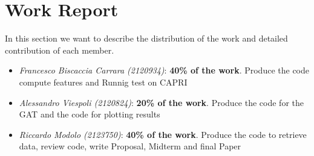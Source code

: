\documentclass[12pt,conference]{ieeeconf} %
\begin{document}
\section*{Work Report}
In this section we want to describe the distribution of the work and detailed contribution of each member.
\begin{itemize}
    \item \textit{Francesco Biscaccia Carrara (2120934)}: {\textbf{40\% of the work}. Produce the code compute features and Runnig test on CAPRI}\\
    \item \textit{Alessandro Viespoli (2120824)}: {\textbf{20\% of the work}. Produce the code for the GAT and the code for plotting results}\\
    \item \textit{Riccardo Modolo (2123750)}: {\textbf{40\% of the work}. Produce the code to retrieve data, review code, write Proposal, Midterm  and final Paper}
\end{itemize}
\end{document}
